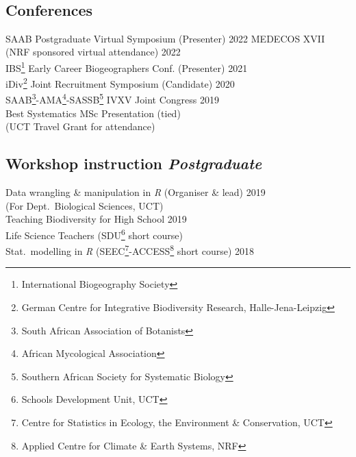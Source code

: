 \documentclass[10pt]{article}
\begin{document}
\begin{multicols}{2}
\

\subsection*{Conferences} %

SAAB Postgraduate Virtual Symposium {\small (Presenter)} \hfill {\small 2022}                 
MEDECOS XVII {\small (NRF sponsored virtual attendance)} \hfill {\small       2022} \\
IBS\footnote{International
  Biogeography Society} Early Career
  Biogeographers Conf. {\small (Presenter)} \hfill {\small       2021} \\
iDiv\footnote{German Centre for
  Integrative Biodiversity Research,
  Halle-Jena-Leipzig} Joint Recruitment Symposium  {\small (Candidate)} \hfill {\small       2020} \\
SAAB\footnote{South African
  Association of Botanists}-AMA\footnote{African
  Mycological Association}-SASSB\footnote{Southern
  African Society for Systematic Biology} IVXV Joint Congress \hfill {\small 2019} \\
\hspace{2em} {\small Best Systematics MSc Presentation (tied)} \\
\hspace{2em} {\small(UCT Travel Grant for attendance)}

\subsection*{Workshop instruction %
                                 \hfill {\small \textmd{\textit{Postgraduate}}}}

Data wrangling \& manipulation in \textit{R} {\small (Organiser \& lead)}                       \hfill {\small             2019} \\
  \hspace{2em} {\small (For Dept.~Biological Sciences, UCT)} \\
Teaching Biodiversity for High School        \hfill {\small             2019}                                 \\
  \hspace{2em} Life Science Teachers {\small
  (SDU\footnote{Schools Development Unit,
  UCT} short course)}                         \\
Stat.~modelling in \textit{R} {\small
  (SEEC\footnote{Centre for Statistics in
  Ecology, the Environment \&
  Conservation, UCT}-ACCESS\footnote{Applied
  Centre for Climate \& Earth Systems, NRF}
  short course)}                             \hfill {\small             2018}



\end{multicols}
\end{document}
